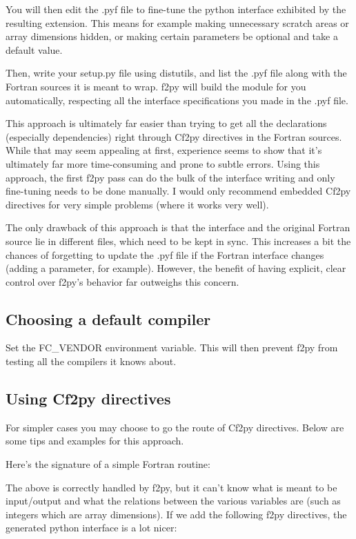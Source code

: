 You will then edit the .pyf file to fine-tune the python interface
exhibited by the resulting extension. This means for example making
unnecessary scratch areas or array dimensions hidden, or making certain
parameters be optional and take a default value.

Then, write your setup.py file using distutils, and list the .pyf
file along with the Fortran sources it is meant to wrap. f2py will
build the module for you automatically, respecting all the interface
specifications you made in the .pyf file.

This approach is ultimately far easier than trying to get all the
declarations (especially dependencies) right through Cf2py directives
in the Fortran sources. While that may seem appealing at first, experience
seems to show that it's ultimately far more time-consuming and prone
to subtle errors. Using this approach, the first f2py pass can do
the bulk of the interface writing and only fine-tuning needs to be
done manually. I would only recommend embedded Cf2py directives for
very simple problems (where it works very well).

The only drawback of this approach is that the interface and the original
Fortran source lie in different files, which need to be kept in sync.
This increases a bit the chances of forgetting to update the .pyf
file if the Fortran interface changes (adding a parameter, for example).
However, the benefit of having explicit, clear control over f2py's
behavior far outweighs this concern. 


\subsection{Choosing a default compiler }

Set the FC\_VENDOR environment variable. This will then prevent f2py
from testing all the compilers it knows about. 


\subsection{Using Cf2py directives }

For simpler cases you may choose to go the route of Cf2py directives.
Below are some tips and examples for this approach.

Here's the signature of a simple Fortran routine: 

The above is correctly handled by f2py, but it can't know what is
meant to be input/output and what the relations between the various
variables are (such as integers which are array dimensions). If we
add the following f2py directives, the generated python interface
is a lot nicer: 



